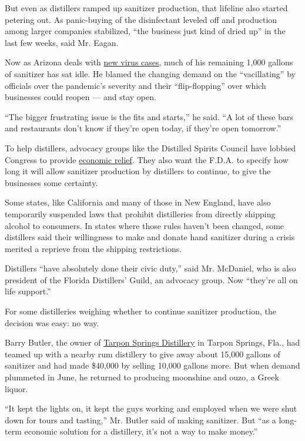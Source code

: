 But even as distillers ramped up sanitizer production, that lifeline
also started petering out. As panic-buying of the disinfectant leveled
off and production among larger companies stabilized, ``the business
just kind of dried up'' in the last few weeks, said Mr. Eagan.

Now as Arizona deals with
\href{https://www.nytimes3xbfgragh.onion/interactive/2020/07/09/us/coronavirus-cases-reopening-trends.html}{new
virus cases}, much of his remaining 1,000 gallons of sanitizer has sat
idle. He blamed the changing demand on the ``vacillating'' by officials
over the pandemic's severity and their ``flip-flopping'' over which
businesses could reopen --- and stay open.

``The bigger frustrating issue is the fits and starts,'' he said. ``A
lot of these bars and restaurants don't know if they're open today, if
they're open tomorrow.''

To help distillers, advocacy groups like the Distilled Spirits Council
have lobbied Congress to provide
\href{https://www.ttb.gov/alcohol/craft-beverage-modernization-and-tax-reform-cbmtra}{economic
relief}. They also want the F.D.A. to specify how long it will allow
sanitizer production by distillers to continue, to give the businesses
some certainty.

Some states, like California and many of those in New England, have also
temporarily suspended laws that prohibit distilleries from directly
shipping alcohol to consumers. In states where those rules haven't been
changed, some distillers said their willingness to make and donate hand
sanitizer during a crisis merited a reprieve from the shipping
restrictions.

Distillers ``have absolutely done their civic duty,'' said Mr. McDaniel,
who is also president of the Florida Distillers' Guild, an advocacy
group. Now ``they're all on life support.''

For some distilleries weighing whether to continue sanitizer production,
the decision was easy: no way.

Barry Butler, the owner of
\href{https://www.tarponspringsdistillery.net/}{Tarpon Springs
Distillery} in Tarpon Springs, Fla., had teamed up with a nearby rum
distillery to give away about 15,000 gallons of sanitizer and had made
\$40,000 by selling 10,000 gallons more. But when demand plummeted in
June, he returned to producing moonshine and ouzo, a Greek liquor.

``It kept the lights on, it kept the guys working and employed when we
were shut down for tours and tasting,'' Mr. Butler said of making
sanitizer. But ``as a long-term economic solution for a distillery, it's
not a way to make money.''


